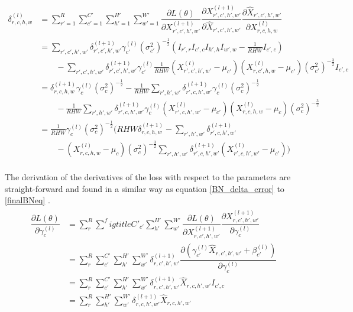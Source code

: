 \documentclass[a4paper, twoside]{article}
\newcommand*{\pd}[2]{\ensuremath{\dfrac{\partial #1}{\partial #2}}}
\begin{document}
\begin{equation}\label{finalBNeq}
\begin{split}
	\delta^{(l)}_{r,c,h,w} 
	& = \sum^{R }_{r'=1} \sum^{C' }_{c'=1} \sum^{H' }_{h'=1} \sum^{W' }_{w'=1} \pd{L(\theta)}{X^{(l+1)}_{r',c',h',w'}} \pd{X^{(l+1)}_{r',c',h',w'}}{\hat{X}_{r',c',h',w'}} \pd{\hat{X}_{r',c',h',w'}}{{X}^{(l)}_{r,c,h,w}}\\
	& = \sum\limits_{r',c',h',w'}\delta^{(l+1)}_{r',c',h',w'} \gamma^{(l)}_{c'} {(\sigma^2_{c'})}^{-\frac{1}{2}} (I_{r',r} I_{c',c} I_{h',h} I_{w',w} - \frac{1}{RHW} I_{c',c}) \\
	& \qquad -\sum\limits_{r',c',h',w'}\delta^{(l+1)}_{r',c',h',w'} \gamma^{(l)}_{c'} \frac{1}{RHW} ({X^{(l)}_{r',c',h',w'} - \mu_{c'}})({X^{(l)}_{r,c',h,w} - \mu_{c'}}) {(\sigma^2_{c'})}^{-\frac{3}{2}} I_{c',c} \\
	& = \delta^{(l+1)}_{r,c,h,w} \gamma^{(l)}_{c} {(\sigma^2_{c})}^{-\frac{1}{2}} - \frac{1}{RHW} \sum\limits_{r',h',w'} \delta^{(l+1)}_{r',c,h',w'} \gamma^{(l)}_{c} {(\sigma^2_{c})}^{-\frac{1}{2}}\\
	& \qquad - \frac{1}{RHW} \sum\limits_{r',h',w'} \delta^{(l+1)}_{r',c,h',w'}\gamma^{(l)}_{c} ({X^{(l)}_{r',c,h',w'} - \mu_{c'}})({X^{(l)}_{r,c,h,w} - \mu_{c}}){(\sigma^2_{c})}^{-\frac{3}{2}} \\
	& = \frac{1}{RHW} \gamma^{(l)}_c {(\sigma^2_{c})}^{-\frac{1}{2}} \biggl(    RHW \delta^{(l+1)}_{r,c,h,w} -  \sum\limits_{r',h',w'} \delta^{(l+1)}_{r',c,h',w'} \qquad \\
	& \qquad -  ({X^{(l)}_{r,c,h,w} - \mu_{c}}) {(\sigma^2_{c})}^{-\frac{3}{2}} \sum\limits_{r',h',w'} \delta^{(l+1)}_{r',c,h',w'} ({X^{(l)}_{r',c,h',w'} - \mu_{c'}}) \biggl) \\
\end{split}
\end{equation}

The derivation of the derivatives of the loss with respect to the parameters are straight-forward and found in a similar way as equation \eqref{BN_delta_error} to \eqref{finalBNeq} \cite{webBN1} \cite{webBN2}. 
\begin{align}
\begin{split}
	\pd{L(\theta)}{\gamma^{(l)}_{c}}
		& = \sum^{R }_{r} \sum^figtitle{C' }_{c'} \sum^{H' }_{h'} \sum^{W' }_{w'} \pd{L(\theta)}{X^{(l+1)}_{r,c',h',w'}} \pd{X^{(l+1)}_{r,c',h',w'}}{\gamma^{(l)}_{c}} \\
		& = \sum^{R }_{r} \sum^{C' }_{c'} \sum^{H' }_{h'} \sum^{W' }_{w'} \delta^{(l+1)}_{r,c',h',w'}  \pd{({\gamma_{c'}^{(l)} \hat{X}_{r,c',h',w'} + \beta_{c'}^{(l)}})}{\gamma^{(l)}_{c}} \\
		& = \sum^{R }_{r} \sum^{C' }_{c'} \sum^{H' }_{h'} \sum^{W' }_{w'} \delta^{(l+1)}_{r,c',h',w'} \hat{X}_{r,c,h',w'} I_{c',c}\\
		& = \sum^{R }_{r} \sum^{H' }_{h'} \sum^{W' }_{w'} \delta^{(l+1)}_{r,c,h',w'} \hat{X}_{r,c,h',w'} \\
\end{split}
\end{align}
\end{document}
